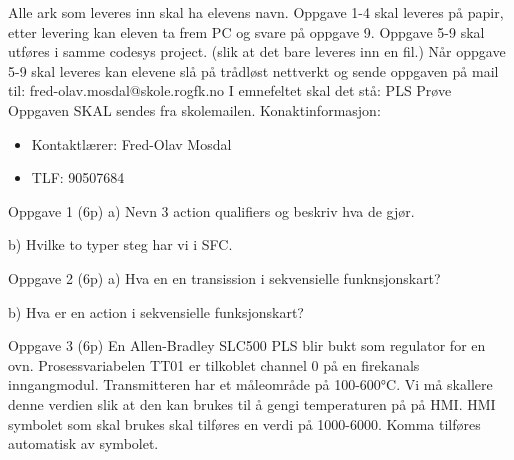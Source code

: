 \vskip 5pt 
\vskip 10pt 
Alle ark som leveres inn skal ha elevens navn.
\vskip 2.5pt 
Oppgave 1-4 skal leveres på papir, etter levering kan eleven ta frem PC og svare på oppgave 9. 
\vskip 2.5pt 
Oppgave 5-9 skal utføres i samme codesys project. (slik at det bare leveres inn en fil.)
Når oppgave 5-9 skal leveres kan elevene slå på trådløst nettverkt og sende oppgaven på mail til:
\vskip 2.5pt 
fred-olav.mosdal@skole.rogfk.no
\vskip 2.5pt 
I emnefeltet skal det stå: PLS Prøve
\vskip 2.5pt
Oppgaven SKAL sendes fra skolemailen. 
\vskip 2cm   
Konaktinformasjon:
\begin{itemize}[noitemsep]
	\item Kontaktlærer: Fred-Olav Mosdal
	\item TLF: 90507684
\end{itemize}


\vfil \eject
Oppgave 1 (6p)%
\vskip 2.5pt 
a) Nevn 3 action qualifiers og beskriv hva de gjør.
\vskip 2.5pt 
\vskip 2.5pt 
b) Hvilke to typer steg har vi i SFC.
\vskip 2.5pt 
\vfil\eject

Oppgave 2 (6p) %
\vskip 2.5pt 
a) Hva en en transission i sekvensielle funknsjonskart?\\
\vskip 2.5pt 
\vskip 10pt 
b) Hva er en action i sekvensielle funksjonskart?\\
\vskip 2.5pt 
\vskip 2.5pt 
\vskip 2.5pt 
\vfil\eject

Oppgave 3 (6p)%
\vskip 2.5pt 
En Allen-Bradley SLC500 PLS blir bukt som regulator for en ovn. Prosessvariabelen TT01 er tilkoblet channel 0 på en firekanals inngangmodul. Transmitteren har et måleområde på 100-600°C. Vi må skallere denne verdien slik at den kan brukes til å gengi temperaturen på på HMI. HMI symbolet som skal brukes skal tilføres en verdi på 1000-6000. Komma tilføres automatisk av symbolet.  



